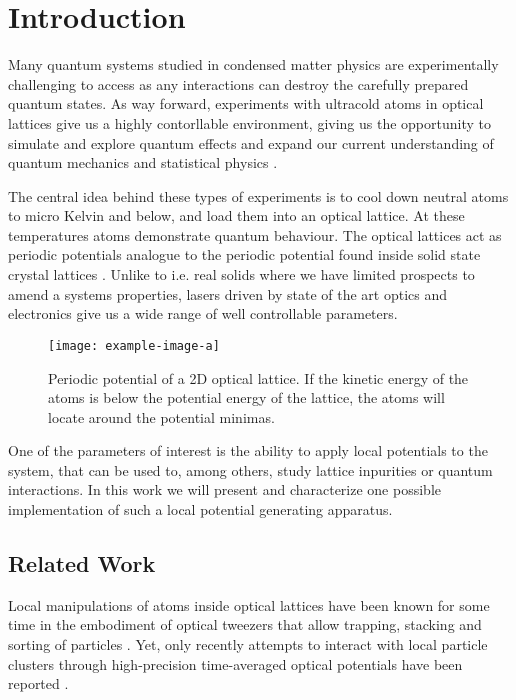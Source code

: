 \chapter{Introduction}

Many quantum systems studied in condensed matter physics are experimentally
challenging to access as any interactions can destroy the carefully prepared
quantum states. As way forward, experiments with ultracold atoms in
optical lattices give us a highly contorllable environment, giving us the
opportunity to simulate and explore quantum effects and expand our current
understanding of quantum mechanics and statistical physics \cite{Gross2017}.

The central idea behind these types of experiments is to cool down neutral
atoms to micro Kelvin and below, and load them into an optical lattice. At
these temperatures atoms demonstrate quantum behaviour. The optical lattices
act as periodic potentials analogue to the periodic potential found inside
solid state crystal lattices \cite{Lewenstein2007}. Unlike to i.e. real solids
where we have limited prospects to amend a systems properties, lasers driven
by state of the art optics and electronics give us a wide range of well
controllable parameters.

\begin{figure}[h]
  \centering
  \texttt{[image: example-image-a]}
  \captionsetup{width=.8\textwidth}
  \caption{Periodic potential of a 2D optical lattice. If the kinetic energy
  of the atoms is below the potential energy of the lattice, the atoms will
  locate around the potential minimas.}
  \label{fig:optlat}
\end{figure}

One of the parameters of interest is the ability to apply local potentials
to the system, that can be used to, among others, study lattice inpurities
or quantum interactions. In this work we will present and characterize one
possible implementation of such a local potential generating apparatus.

\section{Related Work}

Local manipulations of atoms inside optical lattices have been known for some
time in the embodiment of optical tweezers that allow trapping, stacking and
sorting of particles \cite{Tadmor2004}. Yet, only recently attempts to
interact with local particle clusters through high-precision time-averaged
optical potentials have been reported \cite{Roy2016}.

